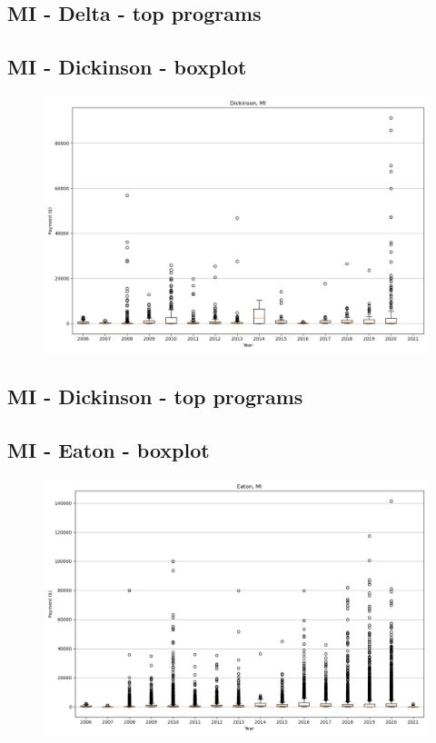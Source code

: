 \subsection*{MI - Delta - top programs}

\newpage
\subsection*{MI - Dickinson - boxplot}
\begin{figure}[h]
\centering
\includegraphics[width=7in]{../output/boxplots/counties/Dickinson-MI_boxplot.png}
\end{figure}


\subsection*{MI - Dickinson - top programs}

\newpage
\subsection*{MI - Eaton - boxplot}
\begin{figure}[h]
\centering
\includegraphics[width=7in]{../output/boxplots/counties/Eaton-MI_boxplot.png}
\end{figure}


